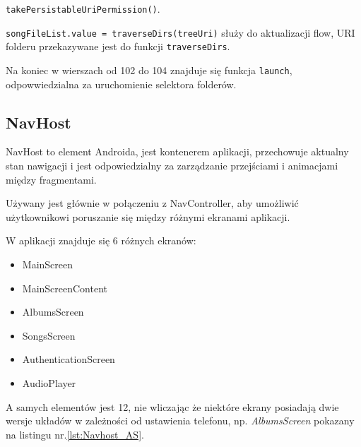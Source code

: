 \texttt{takePersistableUriPermission()}.

\texttt{songFileList.value = traverseDirs(treeUri)} służy do aktualizacji flow, URI folderu przekazywane jest do funkcji \texttt{traverseDirs}.

Na koniec w wierszach od 102 do 104 znajduje się funkcja \texttt{launch}, odpowwiedzialna za uruchomienie selektora folderów.
\newpage
\subsection{NavHost}

NavHost to element Androida, jest kontenerem aplikacji,
przechowuje aktualny stan nawigacji i jest odpowiedzialny
za zarządzanie przejściami i animacjami między fragmentami.

Używany jest głównie w połączeniu z NavController,
aby umożliwić użytkownikowi poruszanie się między
różnymi ekranami aplikacji.

W aplikacji znajduje się 6 różnych ekranów:
\begin{itemize}
    \item MainScreen
    \item MainScreenContent
    \item AlbumsScreen
    \item SongsScreen
    \item AuthenticationScreen
    \item AudioPlayer
\end{itemize}

A samych elementów jest 12, nie wliczając że niektóre ekrany
posiadają dwie wersje układów w
zależności od ustawienia telefonu, np. \textit{AlbumsScreen} pokazany na listingu nr.\ref{lst:Navhost_AS}.

